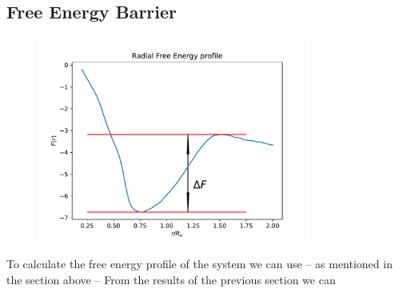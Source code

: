 \documentclass[../main.tex]{subfiles}
\begin{document}
\subsection{Free Energy Barrier}

\begin{figure}[htpb]
    \centering
    \includegraphics[width=0.8\textwidth]{../figures/ex1_free_energy_profile.pdf}
    \caption{}
    \label{fig:ex1_free_energy_profile}
\end{figure}

To calculate the free energy profile of the system we can use -- as mentioned in the section above --
From the results of the previous section we can




\ifSubfilesClassLoaded{
}{
    \newpage
}
\end{document}
